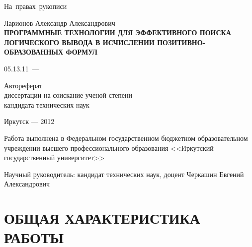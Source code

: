 \documentclass[a4paper]{report}
\begin{document}
\begin{titlepage}
\hfill{\vbox{\hbox{На правах рукописи}}}
\vspace{1cm}\vfill
\begin{center}
    Ларионов Александр Александрович \\
    \vspace{0.5cm}
\bf ПРОГРАММНЫЕ ТЕХНОЛОГИИ ДЛЯ ЭФФЕКТИВНОГО ПОИСКА ЛОГИЧЕСКОГО ВЫВОДА В ИСЧИСЛЕНИИ ПОЗИТИВНО-ОБРАЗОВАННЫХ ФОРМУЛ
\end{center}
\vfill
\hfil\hbox{\hbox{05.13.11 --- }
    \hbox{}%
}\hfil
\vspace{1cm}
\begin{center}
    Автореферат \\
    диссертации на соискание ученой степени \\
    кандидата технических наук
\end{center}
\vfill
\vfill
\begin{center}
{Иркутск --- 2012}
\end{center}
\end{titlepage}

%
\def\namepc{\hbox{$\rm\mu{}$PrISM}}

\newpage

Работа выполнена в Федеральном государственном бюджетном образовательном учреждении высшего профессионального образования <<Иркутский государственный университет>>

Научный руководитель: кандидат технических наук, доцент Черкашин Евгений Александрович


\newpage

\section*{ОБЩАЯ ХАРАКТЕРИСТИКА РАБОТЫ}
\end{document}
